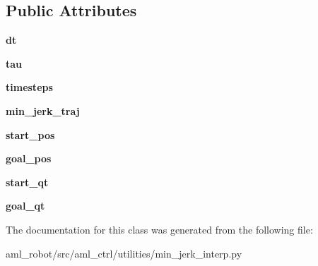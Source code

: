 \subsection*{Public Attributes}
\begin{DoxyCompactItemize}
\item 
\hypertarget{classaml__ctrl_1_1utilities_1_1min__jerk__interp_1_1_min_jerk_interp_a3cf50dd857ae275c6a9309c560a334f0}{}\label{classaml__ctrl_1_1utilities_1_1min__jerk__interp_1_1_min_jerk_interp_a3cf50dd857ae275c6a9309c560a334f0} 
{\bfseries dt}
\item 
\hypertarget{classaml__ctrl_1_1utilities_1_1min__jerk__interp_1_1_min_jerk_interp_abfbc4183bd40597d1f8ef549c8a954cd}{}\label{classaml__ctrl_1_1utilities_1_1min__jerk__interp_1_1_min_jerk_interp_abfbc4183bd40597d1f8ef549c8a954cd} 
{\bfseries tau}
\item 
\hypertarget{classaml__ctrl_1_1utilities_1_1min__jerk__interp_1_1_min_jerk_interp_a53f374cd9afb16fb0293c4f65987795d}{}\label{classaml__ctrl_1_1utilities_1_1min__jerk__interp_1_1_min_jerk_interp_a53f374cd9afb16fb0293c4f65987795d} 
{\bfseries timesteps}
\item 
\hypertarget{classaml__ctrl_1_1utilities_1_1min__jerk__interp_1_1_min_jerk_interp_a655ecaf3042fd23a9dea45fcac07c520}{}\label{classaml__ctrl_1_1utilities_1_1min__jerk__interp_1_1_min_jerk_interp_a655ecaf3042fd23a9dea45fcac07c520} 
{\bfseries min\+\_\+jerk\+\_\+traj}
\item 
\hypertarget{classaml__ctrl_1_1utilities_1_1min__jerk__interp_1_1_min_jerk_interp_a2154616a9adab36c591fc90b62ac66cc}{}\label{classaml__ctrl_1_1utilities_1_1min__jerk__interp_1_1_min_jerk_interp_a2154616a9adab36c591fc90b62ac66cc} 
{\bfseries start\+\_\+pos}
\item 
\hypertarget{classaml__ctrl_1_1utilities_1_1min__jerk__interp_1_1_min_jerk_interp_af33d73bed61d6eebe0ddbb1ca953a881}{}\label{classaml__ctrl_1_1utilities_1_1min__jerk__interp_1_1_min_jerk_interp_af33d73bed61d6eebe0ddbb1ca953a881} 
{\bfseries goal\+\_\+pos}
\item 
\hypertarget{classaml__ctrl_1_1utilities_1_1min__jerk__interp_1_1_min_jerk_interp_a1d7c1d1cc8b9b64922061d060d331d8a}{}\label{classaml__ctrl_1_1utilities_1_1min__jerk__interp_1_1_min_jerk_interp_a1d7c1d1cc8b9b64922061d060d331d8a} 
{\bfseries start\+\_\+qt}
\item 
\hypertarget{classaml__ctrl_1_1utilities_1_1min__jerk__interp_1_1_min_jerk_interp_a6aa537ca52a3e35e06ef582303e4501f}{}\label{classaml__ctrl_1_1utilities_1_1min__jerk__interp_1_1_min_jerk_interp_a6aa537ca52a3e35e06ef582303e4501f} 
{\bfseries goal\+\_\+qt}
\end{DoxyCompactItemize}


The documentation for this class was generated from the following file\+:\begin{DoxyCompactItemize}
\item 
aml\+\_\+robot/src/aml\+\_\+ctrl/utilities/min\+\_\+jerk\+\_\+interp.\+py\end{DoxyCompactItemize}

